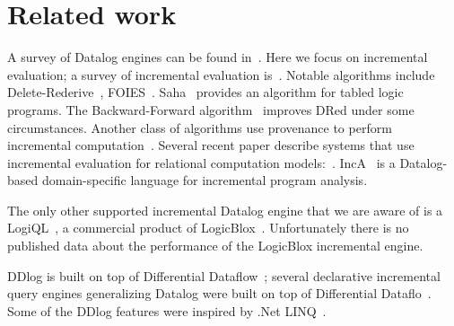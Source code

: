 \section{Related work}

A survey of Datalog engines can be found in~\cite{Maier-book18}.  Here
we focus on incremental evaluation; a survey of incremental evaluation
is~\cite{gupta-deb95}.  Notable algorithms include
Delete-Rederive~\cite{Gupta-sigmod93}, FOIES~\cite{dong-dbpl94}.
Saha~\cite{saha-iclp03} provides an algorithm for tabled logic
programs.  The Backward-Forward algorithm~\cite{motik-aaai15} improves
DRed under some circumstances.  Another class of algorithms use
provenance to perform incremental computation~\cite{liu-icde09}.
Several recent paper describe systems that use incremental evaluation
for relational computation models:~\cite{ahmad-vldb12,zhao-icmd17}.
IncA~\cite{IncA,Szabo-ase016} is a Datalog-based domain-specific
language for incremental program analysis.

The only other supported incremental Datalog engine that we are aware
of is a LogiQL~\cite{Green-pods15}, a commercial product of
LogicBlox~\cite{Aref-sigmod15}.  Unfortunately there is no published
data about the performance of the LogicBlox incremental engine.

DDlog is built on top of Differential
Dataflow~\cite{differential-dataflow}; several declarative incremental
query engines generalizing Datalog were built on top of
Differential Dataflo~\cite{timely-dataflow,differential-dataflow-paper}.  Some of the
DDlog features were inspired by .Net LINQ~\cite{meijer-dpcool03}.
